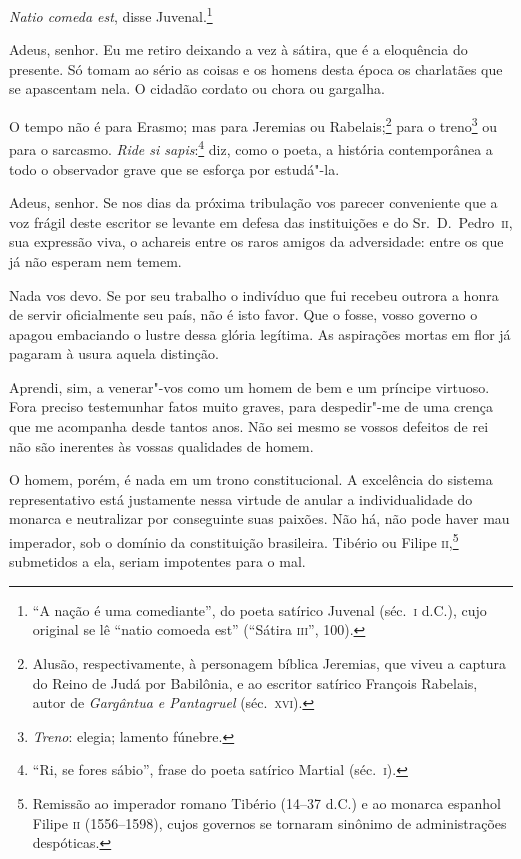  \textit{Natio comeda est}, disse
Juvenal.\footnote{ ``A nação é uma comediante'', do poeta satírico Juvenal 
(séc.~\textsc{i} d.C.), cujo original se lê ``natio comoeda est'' 
(``Sátira \textsc{iii}'', 100).}


 Adeus, senhor. Eu me retiro deixando a vez à sátira, que é a eloquência
do presente. Só tomam ao sério as coisas e os homens desta época os
charlatães que se apascentam nela. O cidadão cordato ou chora ou gargalha.

 O tempo não é para Erasmo; mas para Jeremias ou
Rabelais;\footnote{ Alusão, respectivamente, à personagem bíblica Jeremias, que viveu a
captura do Reino de Judá por Babilônia, e ao escritor satírico François
Rabelais, autor de \textit{Gargântua e Pantagruel} (séc.~\textsc{xvi}).}
 para o treno\footnote{ \textit{Treno}: elegia; lamento fúnebre.}
 ou para o sarcasmo. \textit{Ride si sapis}:\footnote{ ``Ri, se
fores sábio'', frase do poeta satírico Martial (séc.~\textsc{i}).}
 diz, como o poeta, a história contemporânea a todo o observador grave
que se esforça por estudá"-la. 

 Adeus, senhor. Se nos dias da próxima tribulação vos parecer
conveniente que a voz frágil deste escritor se levante em defesa das
instituições e do Sr.~D.~Pedro~\textsc{ii}, sua expressão viva, o achareis entre
os raros amigos da adversidade: entre os que já não esperam nem temem. 

 Nada vos devo. Se por seu trabalho o indivíduo que fui recebeu
outrora a honra de servir oficialmente seu país, não é isto favor. Que
o fosse, vosso governo o apagou embaciando o lustre dessa glória
legítima. As aspirações mortas em flor já pagaram à usura aquela distinção. 

 Aprendi, sim, a venerar"-vos como um homem de bem e um príncipe
virtuoso. Fora preciso testemunhar fatos muito graves, para
despedir"-me de uma crença que me acompanha desde tantos anos. Não sei
mesmo se vossos defeitos de rei não são inerentes às vossas qualidades	
de homem. 

 O homem, porém, é nada em um trono constitucional. A excelência do
sistema representativo está justamente nessa virtude de anular a
individualidade do monarca e neutralizar por conseguinte suas paixões.
Não há, não pode haver mau imperador, sob o domínio da constituição
brasileira. Tibério ou Filipe
\textsc{ii},\footnote{ Remissão ao
imperador romano Tibério (14--37 d.C.) e ao monarca espanhol Filipe \textsc{ii}
(1556--1598), cujos governos se tornaram sinônimo de administrações
despóticas.} submetidos a ela, seriam impotentes para o mal. 

